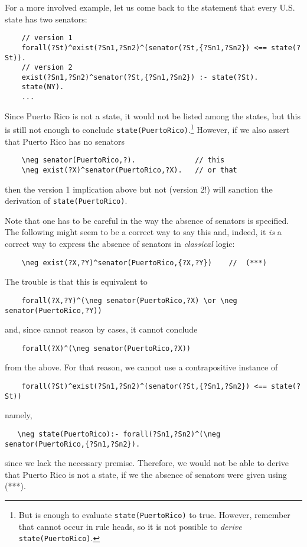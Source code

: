 For a more involved example, let us come back to the statement that
every U.S. state has two senators:
\begin{verbatim}
    // version 1
    forall(?St)^exist(?Sn1,?Sn2)^(senator(?St,{?Sn1,?Sn2}) <== state(?St)).
    // version 2
    exist(?Sn1,?Sn2)^senator(?St,{?Sn1,?Sn2}) :- state(?St).
    state(NY).
    ...
\end{verbatim}
Since Puerto Rico is not a state, it would not be listed among the states, but
this is still not enough to conclude \texttt{\RULELOGNEG state(PuertoRico)}.\footnote{
  But is enough to evaluate \texttt{\RULELOGNAF state(PuertoRico)} to true.
  However, remember that \texttt{\RULELOGNAF} cannot occur in rule heads, so
  it is not possible to \emph{derive}  \texttt{\RULELOGNAF
    state(PuertoRico)}.
}
However, if we also assert that Puerto Rico has no senators
\begin{verbatim}
    \neg senator(PuertoRico,?).              // this
    \neg exist(?X)^senator(PuertoRico,?X).   // or that
\end{verbatim}
then the version 1 implication above but not (version 2!) will sanction
the derivation of \texttt{\RULELOGNEG state(PuertoRico)}.

Note that one has to be careful in the way the absence of senators is
specified.  The following might seem to be a correct way to say this and,
indeed, it \emph{is} a correct way to express the absence of senators in
\emph{classical} logic:
\begin{verbatim}
    \neg exist(?X,?Y)^senator(PuertoRico,{?X,?Y})    //  (***)
\end{verbatim}
The trouble is that this is equivalent to
\begin{verbatim}
    forall(?X,?Y)^(\neg senator(PuertoRico,?X) \or \neg senator(PuertoRico,?Y))
\end{verbatim}
and, since \ERGO cannot reason by cases, it cannot
conclude
\begin{verbatim}
    forall(?X)^(\neg senator(PuertoRico,?X)) 
\end{verbatim}
from the above.
For that reason, we cannot use a contrapositive instance of
\begin{verbatim}
    forall(?St)^exist(?Sn1,?Sn2)^(senator(?St,{?Sn1,?Sn2}) <== state(?St))
\end{verbatim}
namely,
\begin{verbatim}
   \neg state(PuertoRico):- forall(?Sn1,?Sn2)^(\neg senator(PuertoRico,{?Sn1,?Sn2}).
\end{verbatim}
since we lack the necessary premise. Therefore, we would not be able to
derive that Puerto Rico is not a state, if we the absence of senators were
given using (***).



